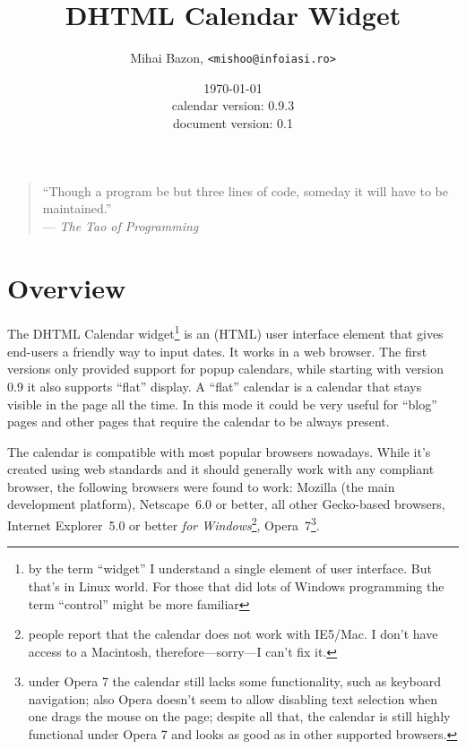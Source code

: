 \documentclass[a4paper,10pt]{article}
\title{DHTML Calendar Widget}
\author{Mihai Bazon, \texttt{<mishoo@infoiasi.ro>}}
\date{\today\\\vspace{0.2ex}
{\small
calendar version: 0.9.3\\
document version: 0.1
}
}
\begin{document}
\maketitle

{\begin{small}\begin{quote}
{\begin{flushright}
\noindent
``Though a program be but three lines of code, someday it will have to be
maintained.''\\
--- \emph{The Tao of Programming}
\end{flushright}}
\end{quote}\end{small}}
\tableofcontents


\section{Overview}

The DHTML Calendar widget\footnote
        {
        by the term ``widget'' I understand a single element of user interface.
        But that's in Linux world.  For those that did lots of Windows
        programming the term ``control'' might be more familiar
        }
is an (HTML) user interface element that gives end-users a friendly way to
input dates.  It works in a web browser.  The first versions only provided
support for popup calendars, while starting with version 0.9 it also supports
``flat'' display.  A ``flat'' calendar is a calendar that stays visible in the
page all the time.  In this mode it could be very useful for ``blog'' pages and
other pages that require the calendar to be always present.

The calendar is compatible with most popular browsers nowadays.  While it's
created using web standards and it should generally work with any compliant
browser, the following browsers were found to work: Mozilla (the main
development platform), Netscape~6.0 or better, all other Gecko-based browsers,
Internet Explorer~5.0 or better \emph{for Windows}\footnote{people report that the calendar does
not work with IE5/Mac.  I don't have access to a Macintosh,
therefore---sorry---I can't fix it.}, Opera~7\footnote
        { under Opera 7 the calendar still lacks some functionality, such as
        keyboard navigation; also Opera doesn't seem to allow disabling text
        selection when one drags the mouse on the page; despite all that, the
        calendar is still highly functional under Opera 7 and looks as good as
        in other supported browsers. }.
\end{document}
